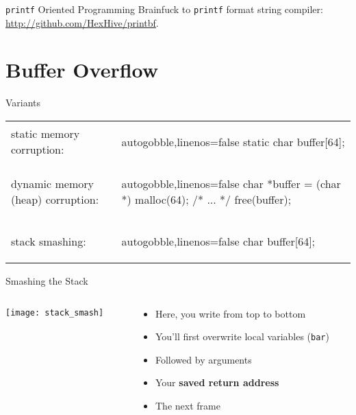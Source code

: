 \documentclass[beamer]{uibk}
\begin{document}
\begin{frame}{\texttt{printf} Oriented Programming}
    Brainfuck to \texttt{printf} format string compiler:\\
    \url{http://github.com/HexHive/printbf}.
\end{frame}

\section{Buffer Overflow}

\begin{frame}[fragile]{Variants}
    \begin{tabular}{p{} p{}}
        static memory corruption: &
        \begin{ccode*}{autogobble,linenos=false}
            static char buffer[64];
        \end{ccode*}
        \bigskip\\
        dynamic memory (heap) corruption: &
        \begin{ccode*}{autogobble,linenos=false}
            char *buffer = (char *) malloc(64);
            /* ... */
            free(buffer);
        \end{ccode*}
        \bigskip\\
        stack smashing: &
        \begin{ccode*}{autogobble,linenos=false}
            char buffer[64];
        \end{ccode*}
    \end{tabular}
\end{frame}

\begin{frame}{Smashing the Stack}
    \begin{columns}
        \begin{column}{0.5\textwidth}
            \begin{center}
                \texttt{[image: stack\_smash]}
            \end{center}
        \end{column}
        \begin{column}{0.5\textwidth}
            \begin{itemize}
                \item Here, you write from top to bottom \bigskip
                \item You'll first overwrite local variables (\texttt{bar}) \bigskip
                \item Followed by arguments \bigskip
                \item Your \textbf{saved return address} \bigskip
                \item The next frame
            \end{itemize}
        \end{column}
    \end{columns}
\end{frame}
\end{document}
